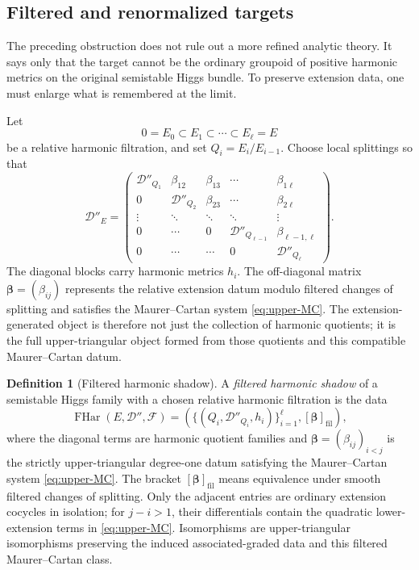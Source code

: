 \documentclass[11pt,reqno]{amsart}
\theoremstyle{definition}
\newtheorem{definition}[theorem]{Definition}
\theoremstyle{remark}
\newcommand{\cD}{\mathcal D}
\begin{document}
\subsection{Filtered and renormalized targets}

The preceding obstruction does not rule out a more refined analytic theory.  It says only that the target cannot be the ordinary groupoid of positive harmonic metrics on the original semistable Higgs bundle.  To preserve extension data, one must enlarge what is remembered at the limit.

Let
\[
  0=E_0\subset E_1\subset\cdots\subset E_\ell=E
\]
be a relative harmonic filtration, and set $Q_i=E_i/E_{i-1}$.  Choose local splittings so that
\begin{equation}\label{eq:upper-triangular-Ddoubleprime-heat}
  \cD''_E=
  \begin{pmatrix}
  \cD''_{Q_1}&\beta_{12}&\beta_{13}&\cdots&\beta_{1\ell}\\
  0&\cD''_{Q_2}&\beta_{23}&\cdots&\beta_{2\ell}\\
  \vdots&\ddots&\ddots&\ddots&\vdots\\
  0&\cdots&0&\cD''_{Q_{\ell-1}}&\beta_{\ell-1,\ell}\\
  0&\cdots&\cdots&0&\cD''_{Q_\ell}
  \end{pmatrix}.
\end{equation}
The diagonal blocks carry harmonic metrics $h_i$.  The off-diagonal
matrix $\boldsymbol\beta=(\beta_{ij})$ represents the relative
extension datum modulo filtered changes of splitting and satisfies the
Maurer--Cartan system \eqref{eq:upper-MC}.  The extension-generated
object is therefore not just the collection of harmonic quotients; it
is the full upper-triangular object formed from those quotients and this
compatible Maurer--Cartan datum.

\begin{definition}[Filtered harmonic shadow]\label{def:filtered-harmonic-shadow}
A \emph{filtered harmonic shadow} of a semistable Higgs family with a chosen relative harmonic filtration is the data
\[
  \operatorname{FHar}(E,\cD'',\mathcal F)
  =\left(\{(Q_i,\cD''_{Q_i},h_i)\}_{i=1}^\ell,
  [\boldsymbol\beta]_{\mathrm{fil}}\right),
\]
where the diagonal terms are harmonic quotient families and
$\boldsymbol\beta=(\beta_{ij})_{i<j}$ is the strictly upper-triangular
degree-one datum satisfying the Maurer--Cartan system
\eqref{eq:upper-MC}.  The bracket $[\boldsymbol\beta]_{\mathrm{fil}}$
means equivalence under smooth filtered changes of splitting.  Only the
adjacent entries are ordinary extension cocycles in isolation; for
$j-i>1$, their differentials contain the quadratic lower-extension
terms in \eqref{eq:upper-MC}.  Isomorphisms are upper-triangular
isomorphisms preserving the induced associated-graded data and this
filtered Maurer--Cartan class.
\end{definition}
\end{document}
